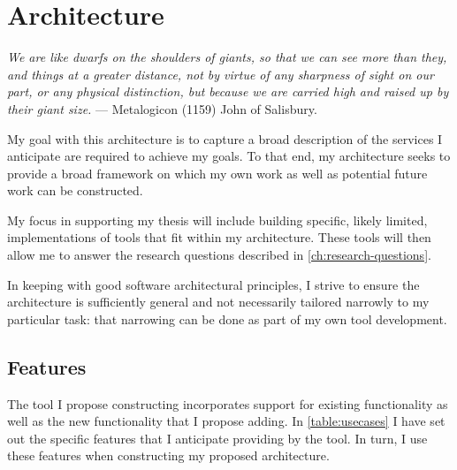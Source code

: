 \chapter{Architecture}
\label{ch:architecture}
\label{ch:model:sec:architecture:subsec:services} %

\begin{epigraph}
    \emph{We are like dwarfs on the shoulders of giants, so that we can see more than
        they, and things at a greater distance, not by virtue of any sharpness of sight
        on our part, or any physical distinction, but because we are carried high and
        raised up by their giant size.} --- Metalogicon (1159) John of Salisbury.
\end{epigraph}

My goal with this architecture is to capture a broad description of the services
I anticipate are required to achieve my goals.  To that end, my architecture
seeks to provide a broad framework on which my own work as well as potential
future work can be constructed.

My focus in supporting my thesis will include building specific, likely limited,
implementations of tools that fit within my architecture. These tools will then
allow me to answer the research questions described in
\autoref{ch:research-questions}.

In keeping with good software architectural principles, I strive to ensure the
architecture is sufficiently general and not necessarily tailored narrowly to my
particular task: that narrowing can be done as part of my own tool development.

\section{Features}
\label{ch:architecture:sec:features}

The tool I propose constructing incorporates support for existing functionality
as well as the new functionality that I propose adding. In
\autoref{table:usecases} I have set out the specific features that I anticipate
providing by the tool. In turn, I use these features when constructing my
proposed architecture.

